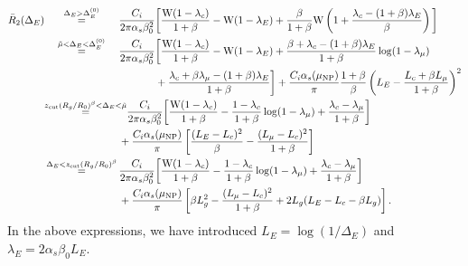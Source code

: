 \documentclass[letterpaper,11pt]{article}
\newcommand{\mut}{\tilde\mu}
\newcommand{\xlog}{{\rm W}}
\newcommand{\wideeq}[1]{\makebox[{#1}]{$=$}}
\newcommand{\as}{\alpha_s}
\newcommand{\zcut}{z_\text{cut}}
\begin{document}
\begin{align}
\bar{R}_2(\Delta_E)
 & \overset{\Delta_E > \Delta_E^{(0)}}{\wideeq{2.5cm}} \frac{C_i}{2\pi \alpha_s \beta_0^2} \bigg[
     \frac{\xlog(1-\lambda_c)}{1+\beta}
     -\xlog(1-\lambda_E)
     +\frac{\beta}{1+\beta} \xlog\left(1+\frac{\lambda_c-(1+\beta) \lambda_E}{\beta}\right) \bigg]\\
 & \overset{\mut < \Delta_E < \Delta_E^{(0)}}{\wideeq{2.5cm}}  \frac{C_i}{2\pi \alpha_s \beta_0^2} \bigg[
     \frac{\xlog(1-\lambda_c)}{1+\beta}
     -\xlog(1-\lambda_E)
     +\frac{\beta+\lambda_c-(1+\beta) \lambda_E}{1+\beta} \log(1-\lambda_\mu)\notag\\
     & \phantom{\wideeq{2.5cm} \frac{C_i}{2\pi \alpha_s \beta_0^2}}
     +\frac{\lambda_c+\beta \lambda_\mu-(1+\beta) \lambda_E}{1+\beta} \bigg] + \frac{C_i\as(\mu_\text{NP})}{\pi} \frac{1+\beta}{\beta} \left(L_E-\frac{L_c+\beta L_\mu}{1+\beta}\right)^2 \\
 & \overset{\zcut (R_g/R_0)^\beta < \Delta_E < \mut}{\wideeq{2.5cm}}  \frac{C_i}{2\pi \alpha_s \beta_0^2} \bigg[
     \frac{\xlog(1-\lambda_c)}{1+\beta}
     -\frac{1-\lambda_c}{1+\beta} \log(1-\lambda_\mu)
     +\frac{\lambda_c-\lambda_\mu}{1+\beta} \bigg] \notag\\
     & \phantom{\wideeq{2.5cm}} + \frac{C_i\as(\mu_\text{NP})}{\pi} \left[ \frac{(L_E-L_c)^2}{\beta} - \frac{(L_\mu-L_c)^2}{1+\beta} \right]\\
 & \overset{\Delta_E < \zcut (R_g/R_0)^\beta}{\wideeq{2.5cm}}  \frac{C_i}{2\pi \alpha_s \beta_0^2} \bigg[
     \frac{\xlog(1-\lambda_c)}{1+\beta}
     -\frac{1-\lambda_c}{1+\beta} \log(1-\lambda_\mu)
     +\frac{\lambda_c-\lambda_\mu}{1+\beta} \bigg] \notag\\
     & \phantom{\wideeq{2.5cm}} + \frac{C_i\as(\mu_\text{NP})}{\pi} \left[ \beta L_g^2-\frac{(L_\mu-L_c)^2}{1+\beta} + 2 L_g (L_E-L_c-\beta L_g)\right].
\end{align}
In the above expressions, we have introduced
$L_E=\log(1/\Delta_E)$ and 
$\lambda_E=2\alpha_s \beta_0 L_E$.






\end{document}
